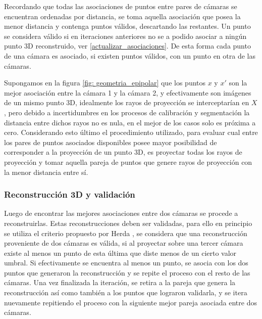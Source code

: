 Recordando que todas las asociaciones de puntos entre pares de cámaras se encuentran ordenadas por distancia, se toma aquella asociación que posea la menor distancia y contenga puntos válidos, descartando las restantes. Un punto se considera válido si en iteraciones anteriores no se a podido asociar a ningún punto 3D reconstruido, ver \ref{actualizar_asociaciones}.
De esta forma cada punto de una cámara es asociado, si existen puntos válidos, con un punto en otra de las cámaras.


 Supongamos en la figura \ref{fig: geometria_epipolar} que los puntos $x$ y $x'$ son la mejor asociación entre la cámara 1 y la cámara 2, y efectivamente son imágenes de un mismo punto 3D, idealmente los rayos de proyección se interceptarían en $X$, pero debido a incertidumbres en los procesos de calibración y segmentación la distancia entre dichos rayos no es nula, en el mejor de los casos solo es próxima a cero. 
Considerando esto último el procedimiento utilizado, para evaluar cual entre los pares de puntos asociados disponibles posee mayor posibilidad de corresponder a la proyección de un punto 3D, es proyectar todas los rayos de proyección y tomar aquella pareja de puntos que genere rayos de proyección con la menor distancia entre sí.


\subsubsection{Reconstrucción 3D y validación}\label{seccion_reconstruccion3D_validacion}


Luego de encontrar las mejores asociaciones entre dos cámaras se procede a reconstruirlas. Estas reconstrucciones deben ser validadas, para ello en principio se utiliza el  criterio propuesto por Herda \cite{herda}, se considera que una reconstrucción proveniente de dos cámaras es válida, si al proyectar sobre una tercer cámara existe al menos un punto de esta última que diste menos de un cierto valor umbral. Si efectivamente se encuentra al menos un punto, se asocia con los dos puntos que generaron la reconstrucción y se repite el proceso con el resto de las cámaras. Una vez finalizada la iteración, se retira a la pareja que genera la reconstrucción así como también a los puntos que lograron validarla, y se itera nuevamente repitiendo el proceso con la siguiente mejor pareja asociada entre dos cámaras.  


